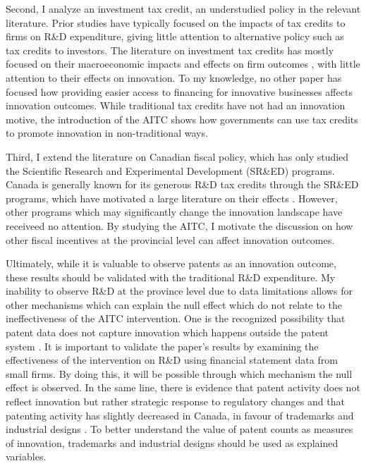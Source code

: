 \documentclass[../main.tex]{subfiles}
\begin{document}
Second, I analyze an investment tax credit, an understudied policy in the relevant literature. Prior studies have typically focused on the impacts of tax credits to firms on R\&D expenditure, giving little attention to alternative policy such as tax credits to investors. The literature on investment tax credits has mostly focused on their macroeconomic impacts and effects on firm outcomes \parencite{pereira94, lyon89,slattery_zidar20}, with little attention to their effects on innovation. To my knowledge, no other paper has focused how providing easier access to financing for innovative businesses affects innovation outcomes. While traditional tax credits have not had an innovation motive, the introduction of the AITC shows how governments can use tax credits to promote innovation in non-traditional ways. 

Third, I extend the literature on Canadian fiscal policy, which has only studied the Scientific Research and Experimental Development (SR\&ED) programs. Canada is generally known for its generous R\&D tax credits through the SR\&ED programs, which have motivated a large literature on their effects \parencite{agrawal_etal20,czarnitzki_etal11,berube_mohnen09,mansfield_switzer85a,bernstein86b}. However, other programs which may significantly change the innovation landscape have receiveed no attention. By studying the AITC, I motivate the discussion on how other fiscal incentives at the provincial level can affect innovation outcomes.

Ultimately, while it is valuable to observe patents as an innovation outcome, these results should be validated with the traditional R\&D expenditure. My inability to observe R\&D at the province level due to data limitations allows for other mechanisms which can explain the null effect which do not relate to the ineffectiveness of the AITC intervention. One is the recognized possibility that patent data does not capture innovation which happens outside the patent system \parencite{moser13}. It is important to validate the paper’s results by examining the effectiveness of the intervention on R\&D using financial statement data from small firms. By doing this, it will be possible through which mechanism the null effect is observed. In the same line, there is evidence that patent activity does not reflect innovation but rather strategic response to regulatory changes \parencite{graham_mowrey04} and that patenting activity has slightly decreased in Canada, in favour of trademarks and industrial designs \parencite{canadianintellectualpropertyoffice22}. To better understand the value of patent counts as measures of innovation, trademarks and industrial designs should be used as explained variables. 
\end{document}
